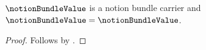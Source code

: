 

\begin{classification}\label{notion_bundle_whole_sibling}
    $\notionBundleValue$ is a notion bundle carrier and
    $\notionBundleValue=\notionBundleValue$.
\end{classification}
\begin{proof}
    Follows by .
\end{proof}
